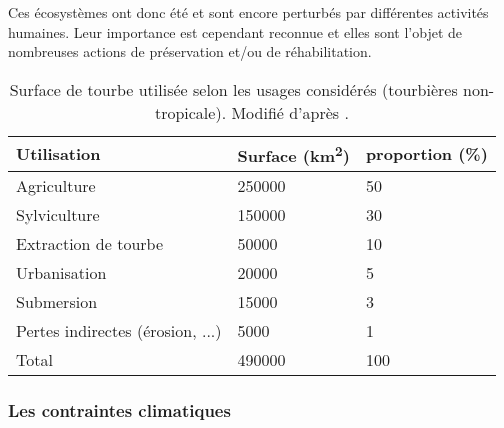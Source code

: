Ces écosystèmes ont donc été et sont encore perturbés par différentes activités humaines.
Leur importance est cependant reconnue et elles sont l'objet de nombreuses actions de préservation et/ou de réhabilitation.
\begin{table}[]
\centering
\caption{Surface de tourbe utilisée selon les usages considérés (tourbières non-tropicale). Modifié d'après \citet{joosten2002}.}
\label{table:tourbeUsage}
\begin{tabular}{lll}\toprule
Utilisation & Surface (\si{\square\kilo\meter})  & proportion (\%) \\ \midrule
Agriculture & \num{250000} & \num{50} \\ 
Sylviculture & \num{150000} & \num{30}\\ 
Extraction de tourbe & \num{50000} & \num{10}\\ 
Urbanisation & \num{20000} & \num{5}\\ 
Submersion & \num{15000} & \num{3}\\ 
Pertes indirectes (érosion, ...) & \num{5000} & \num{1}\\[1ex]
Total & \num{490000} & \num{100}\\
\bottomrule
\end{tabular}
\end{table}


\subsubsection{Les contraintes climatiques}


